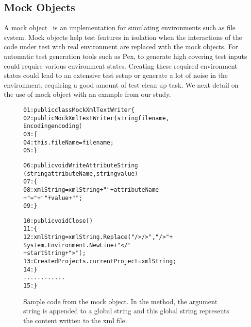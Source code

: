 \subsection{Mock Objects} 
\label{sec:mock}

A mock object~\cite{mockobjects} is an implementation for simulating environments such as file system. Mock objects help test features in isolation when the interactions of the code under test with real environment are replaced with the mock objects. For automatic test generation tools such as Pex, to generate high covering test inputs could require various environment states. Creating these required environment states could lead to an extensive test setup or generate a lot of noise in the environment, requiring a good amount of test clean up task. We next detail on the use of mock object with an example from our study. 

\begin{figure}
\begin{CodeOut}
\begin{alltt}
01: public class MockXmlTextWriter\{ 
02:\hspace*{0.1in}public MockXmlTextWriter(string filename,
\hspace*{0.25in} Encoding encoding)
03:\hspace*{0.1in}\{
04:\hspace*{0.3in}this.fileName = filename;
05:\hspace*{0.1in}\}

06:\hspace*{0.1in}public void WriteAttributeString
\hspace*{0.3in}(string attributeName, string value)
07:\hspace*{0.1in}\{
08:\hspace*{0.3in}xmlString = xmlString + " " + attributeName 
\hspace*{0.7in}+ "=" + "\"" + value + "\"";
09:\hspace*{0.1in}\}

10:\hspace*{0.1in}public void Close()
11:\hspace*{0.1in}\{
12:\hspace*{0.3in}xmlString = xmlString.Replace("/> />", "/>" + 
   \hspace*{0.5in}System.Environment.NewLine + "</" 
   \hspace*{0.7in}+ startString + ">");
13:\hspace*{0.3in}CreatedProjects.currentProject = xmlString;
14:\hspace*{0.1in}\}
\hspace*{0.3in}............
15: \}
\end{alltt}
\end{CodeOut}
\caption{\label{fig:mockobject} Sample code from the  mock object. In the  method, the argument string is appended to a global string  and this global string represents the content written to the xml file.}
\end{figure}

